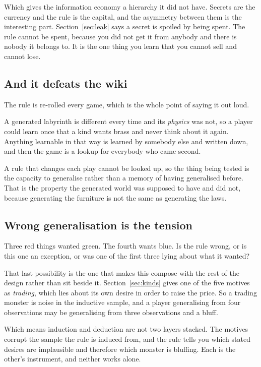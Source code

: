 \documentclass[11pt,a4paper]{article}
\begin{document}
Which gives the information economy a hierarchy it did not have. Secrets are the currency and the
rule is the capital, and the asymmetry between them is the interesting part.
Section~\ref{sec:leak} says a secret is spoiled by being spent. The rule cannot be spent, because
you did not get it from anybody and there is nobody it belongs to. It is the one thing you learn
that you cannot sell and cannot lose.

\subsection{And it defeats the wiki}

The rule is re-rolled every game, which is the whole point of saying it out loud.

A generated labyrinth is different every time and its \emph{physics} was not, so a player could
learn once that a kind wants brass and never think about it again. Anything learnable in that way is
learned by somebody else and written down, and then the game is a lookup for everybody who came
second.

\begin{sectionbox}
A rule that changes each play cannot be looked up, so the thing being tested is the capacity to
generalise rather than a memory of having generalised before. That is the property the generated
world was supposed to have and did not, because generating the furniture is not the same as
generating the laws.
\end{sectionbox}

\subsection{Wrong generalisation is the tension}

Three red things wanted green. The fourth wants blue. Is the rule wrong, or is this one an
exception, or was one of the first three lying about what it wanted?

That last possibility is the one that makes this compose with the rest of the design rather than
sit beside it. Section~\ref{sec:kinds} gives one of the five motives as \emph{trading}, which lies
about its own desire in order to raise the price. So a trading monster is noise in the inductive
sample, and a player generalising from four observations may be generalising from three
observations and a bluff.

\begin{alarmbox}
Which means induction and deduction are not two layers stacked. The motives corrupt the sample the
rule is induced from, and the rule tells you which stated desires are implausible and therefore
which monster is bluffing. Each is the other's instrument, and neither works alone.
\end{alarmbox}
\end{document}
